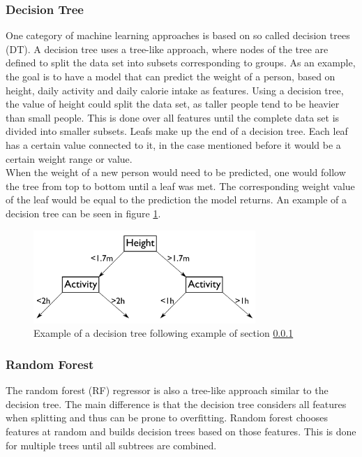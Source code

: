 \subsubsection{Decision Tree}
\label{sec:dt}
One category of machine learning approaches is based on so called decision trees (DT). A decision tree uses a tree-like approach, where nodes of the tree are defined to split the data set into subsets corresponding to groups. As an example, the goal is to have a model that can predict the weight of a person, based on height, daily activity and daily calorie intake as features. Using a decision tree, the value of height could split the data set, as taller people tend to be heavier than small people. This is done over all features until the complete data set is divided into smaller subsets. Leafs make up the end of a decision tree. Each leaf has a certain value connected to it, in the case mentioned before it would be a certain weight range or value. \\
When the weight of a new person would need to be predicted, one would follow the tree from top to bottom until a leaf was met. The corresponding weight value of the leaf would be equal to the prediction the model returns. An example of a decision tree can be seen in figure \ref{fig:dtdiag}.

\begin{figure}[h]
\centering
\includegraphics[width=0.75\textwidth]{figures/dtdiag}
\caption[Diagram of descision tree]{Example of a decision tree following example of section \ref{sec:dt}}
\label{fig:dtdiag}
\end{figure}

\subsubsection{Random Forest}
The random forest (RF) regressor is also a tree-like approach similar to the decision tree. The main difference is that the decision tree considers all features when splitting and thus can be prone to overfitting. Random forest chooses features at random and builds decision trees based on those features. This is done for multiple trees until all subtrees are combined.

